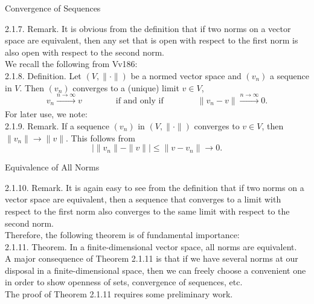 \documentclass[smaller,hyperref={CJKbookmarks=true}]{beamer}
\begin{document}
\begin{frame}[t]{Convergence of Sequences}
\begin{spacing}{1.1}
\alert{2.1.7. Remark.} It is obvious from the definition that if two norms on a
vector space are equivalent, then any set that is open with respect to the
first norm is also open with respect to the second norm.\\
We recall the following from Vv186:\\
\alert{2.1.8. Definition.} Let $(V,\|\cdot\|)$ be a normed vector space and $(v_n)$ a sequence in $V$. Then $(v_n)$ converges to a (unique) limit $v\in V$,
\[v_n\xrightarrow[]{n\to\infty}v\qquad\qquad\text{if and only if}\qquad\qquad\|v_n-v\|\xrightarrow[]{n\to\infty}0.\]
For later use, we note:\\
\alert{2.1.9. Remark.} If a sequence $(v_n)$ in $(V,\|\cdot\|)$ converges to $v\in V$, then $\|v_n\|\to\|v\|$. This follows from
\[\big|\|v_n\|-\|v\|\big|\leq\|v-v_n\|\to0.\]
\end{spacing}
\end{frame}
\begin{frame}[t]{Equivalence of All Norms}
\begin{spacing}{1.1}
\alert{2.1.10. Remark.} It is again easy to see from the definition that if two
norms on a vector space are equivalent, then a sequence that converges to
a limit with respect to the first norm also converges to the same limit with
respect to the second norm.\\[9pt]
Therefore, the following theorem is of fundamental importance:\\[9pt]
\alert{2.1.11. Theorem.} In a finite-dimensional vector space, all norms are equivalent.\\[8pt]
A major consequence of Theorem 2.1.11 is that if we have several norms
at our disposal in a finite-dimensional space, then we can freely choose a
convenient one in order to show openness of sets, convergence of
sequences, etc.\\[7pt]
The proof of Theorem 2.1.11 requires some preliminary work.
\end{spacing}
\end{frame}
\end{document}
